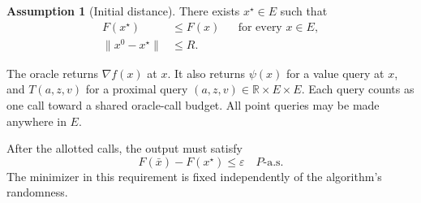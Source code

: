 \documentclass[10pt]{article}
\theoremstyle{definition}
\newtheorem{assumption}{Assumption}
\begin{document}
\begin{assumption}[Initial distance]
There exists $x^\star\in E$ such that
\[
\begin{aligned}
F(x^\star)&\leq F(x) &&\text{for every }x\in E,\\
\|x^0-x^\star\|&\leq R.
\end{aligned}
\]
\end{assumption}

The oracle returns $\nabla f(x)$ at $x$. It also returns $\psi(x)$ for a value query at $x$, and $T(a,z,v)$ for a proximal query $(a,z,v)\in\mathbb{R}\times E\times E$. Each query counts as one call toward a shared oracle-call budget. All point queries may be made anywhere in $E$.

After the allotted calls, the output must satisfy
\[
F(\bar{x})-F(x^\star)\leq\varepsilon
\quad P\text{-a.s.}
\]
The minimizer in this requirement is fixed independently of the algorithm's randomness.
\end{document}

